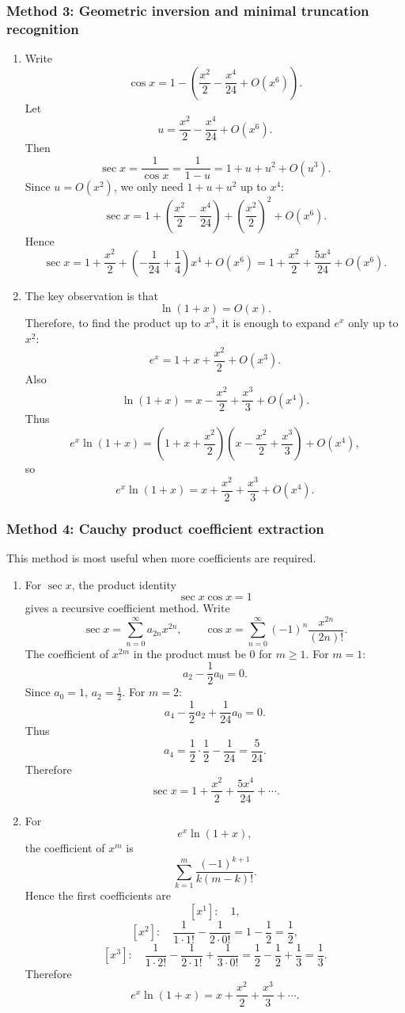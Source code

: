 \documentclass[12pt]{article}
\begin{document}
\newpage
\subsubsection{Method 3: Geometric inversion and minimal truncation recognition}

\begin{enumerate}[label=(\alph*)]

\item
Write
\[
\cos x=1-\left(\frac{x^2}{2}-\frac{x^4}{24}+O(x^6)\right).
\]
Let
\[
u=\frac{x^2}{2}-\frac{x^4}{24}+O(x^6).
\]
Then
\[
\sec x=\frac{1}{\cos x}=\frac{1}{1-u}=1+u+u^2+O(u^3).
\]
Since \(u=O(x^2)\), we only need \(1+u+u^2\) up to \(x^4\):
\[
\sec x
=
1+\left(\frac{x^2}{2}-\frac{x^4}{24}\right)
+
\left(\frac{x^2}{2}\right)^2
+O(x^6).
\]
Hence
\[
\sec x
=
1+\frac{x^2}{2}
+
\left(-\frac1{24}+\frac14\right)x^4
+O(x^6)
=
\boxed{
1+\frac{x^2}{2}+\frac{5x^4}{24}+O(x^6).
}
\]

\item
The key observation is that
\[
\ln(1+x)=O(x).
\]
Therefore, to find the product up to \(x^3\), it is enough to expand \(e^x\) only up
to \(x^2\):
\[
e^x=1+x+\frac{x^2}{2}+O(x^3).
\]
Also
\[
\ln(1+x)=x-\frac{x^2}{2}+\frac{x^3}{3}+O(x^4).
\]
Thus
\[
e^x\ln(1+x)
=
\left(1+x+\frac{x^2}{2}\right)
\left(x-\frac{x^2}{2}+\frac{x^3}{3}\right)
+O(x^4),
\]
so
\[
\boxed{
e^x\ln(1+x)=x+\frac{x^2}{2}+\frac{x^3}{3}+O(x^4).
}
\]

\end{enumerate}

\newpage
\subsubsection{Method 4: Cauchy product coefficient extraction}

This method is most useful when more coefficients are required.

\begin{enumerate}[label=(\alph*)]

\item
For \(\sec x\), the product identity
\[
\sec x\cos x=1
\]
gives a recursive coefficient method. Write
\[
\sec x=\sum_{n=0}^{\infty}a_{2n}x^{2n},
\qquad
\cos x=\sum_{n=0}^{\infty}(-1)^n\frac{x^{2n}}{(2n)!}.
\]
The coefficient of \(x^{2m}\) in the product must be \(0\) for \(m\ge1\).
For \(m=1\):
\[
a_2-\frac12a_0=0.
\]
Since \(a_0=1\), \(a_2=\frac12\). For \(m=2\):
\[
a_4-\frac12a_2+\frac1{24}a_0=0.
\]
Thus
\[
a_4=\frac12\cdot \frac12-\frac1{24}=\frac{5}{24}.
\]
Therefore
\[
\boxed{
\sec x=1+\frac{x^2}{2}+\frac{5x^4}{24}+\cdots.
}
\]

\item
For
\[
e^x\ln(1+x),
\]
the coefficient of \(x^m\) is
\[
\sum_{k=1}^{m}
\frac{(-1)^{k+1}}{k(m-k)!}.
\]
Hence the first coefficients are
\[
[x^1]:\quad 1,
\]
\[
[x^2]:\quad
\frac{1}{1\cdot 1!}-\frac{1}{2\cdot0!}
=
1-\frac12=\frac12,
\]
\[
[x^3]:\quad
\frac{1}{1\cdot2!}-\frac{1}{2\cdot1!}+\frac{1}{3\cdot0!}
=
\frac12-\frac12+\frac13=\frac13.
\]
Therefore
\[
\boxed{
e^x\ln(1+x)=x+\frac{x^2}{2}+\frac{x^3}{3}+\cdots.
}
\]

\end{enumerate}
\end{document}
